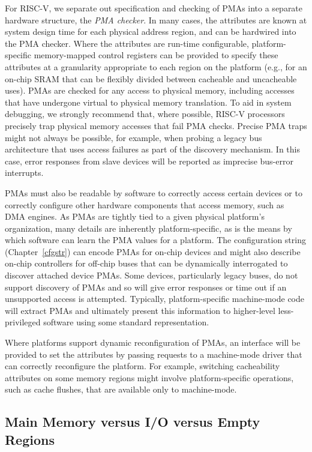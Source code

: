 For RISC-V, we separate out specification and checking of PMAs into a
separate hardware structure, the {\em PMA checker}.  In many cases,
the attributes are known at system design time for each physical
address region, and can be hardwired into the PMA checker.  Where the
attributes are run-time configurable, platform-specific memory-mapped
control registers can be provided to specify these attributes at a
granularity appropriate to each region on the platform (e.g., for an
on-chip SRAM that can be flexibly divided between cacheable and
uncacheable uses).  PMAs are checked for any access to physical
memory, including accesses that have undergone virtual to physical
memory translation.  To aid in system debugging, we strongly recommend
that, where possible, RISC-V processors precisely trap physical memory
accesses that fail PMA checks.  Precise PMA traps might not always be
possible, for example, when probing a legacy bus architecture that
uses access failures as part of the discovery mechanism.  In this
case, error responses from slave devices will be reported as imprecise
bus-error interrupts.

PMAs must also be readable by software to correctly access certain
devices or to correctly configure other hardware components that
access memory, such as DMA engines.  As PMAs are tightly tied to a
given physical platform's organization, many details are inherently
platform-specific, as is the means by which software can learn the PMA
values for a platform.  The configuration string
(Chapter~\ref{cfgstr}) can encode PMAs for on-chip devices and might
also describe on-chip controllers for off-chip buses that can be
dynamically interrogated to discover attached device PMAs.  Some
devices, particularly legacy buses, do not support discovery of PMAs
and so will give error responses or time out if an unsupported access
is attempted.  Typically, platform-specific machine-mode code will
extract PMAs and ultimately present this information to higher-level
less-privileged software using some standard representation.

Where platforms support dynamic reconfiguration of PMAs, an interface
will be provided to set the attributes by passing requests to a
machine-mode driver that can correctly reconfigure the platform.  For
example, switching cacheability attributes on some memory regions
might involve platform-specific operations, such as cache flushes,
that are available only to machine-mode.

\subsection{Main Memory versus I/O versus Empty Regions}

